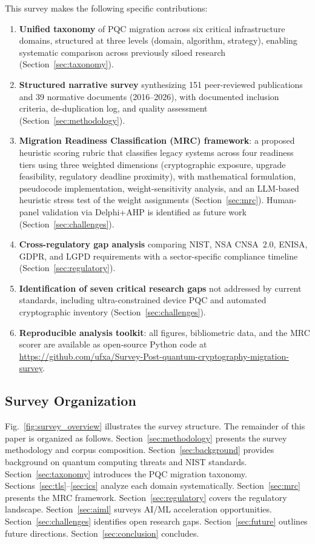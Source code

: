 \documentclass[journal]{IEEEtran}
\begin{document}
This survey makes the following specific contributions:
\begin{enumerate}
  \item \textbf{Unified taxonomy} of PQC migration across six critical
  infrastructure domains, structured at three levels (domain, algorithm,
  strategy), enabling systematic comparison across previously siloed research
  (Section~\ref{sec:taxonomy}).
  \item \textbf{Structured narrative survey} synthesizing 151 peer-reviewed
  publications and 39 normative documents (2016--2026), with documented
  inclusion criteria, de-duplication log, and quality assessment
  (Section~\ref{sec:methodology}).
  \item \textbf{Migration Readiness Classification (MRC) framework}: a proposed
  heuristic scoring rubric that classifies legacy systems across four readiness
  tiers using three weighted dimensions (cryptographic exposure, upgrade
  feasibility, regulatory deadline proximity), with mathematical formulation,
  pseudocode implementation, weight-sensitivity analysis, and an LLM-based
  heuristic stress test of the weight assignments
  (Section~\ref{sec:mrc}). Human-panel validation via Delphi+AHP is identified as
  future work (Section~\ref{sec:challenges}).
  \item \textbf{Cross-regulatory gap analysis} comparing NIST, NSA CNSA~2.0,
  ENISA, GDPR, and LGPD requirements with a sector-specific compliance
  timeline (Section~\ref{sec:regulatory}).
  \item \textbf{Identification of seven critical research gaps} not addressed by
  current standards, including ultra-constrained device PQC and automated
  cryptographic inventory (Section~\ref{sec:challenges}).
  \item \textbf{Reproducible analysis toolkit}: all figures, bibliometric data,
  and the MRC scorer are available as open-source Python code at
  \url{https://github.com/ufxa/Survey-Post-quantum-cryptography-migration-survey}.
\end{enumerate}

\subsection{Survey Organization}

Fig.~\ref{fig:survey_overview} illustrates the survey structure. The remainder
of this paper is organized as follows. Section~\ref{sec:methodology} presents
the survey methodology and corpus composition. Section~\ref{sec:background} provides background
on quantum computing threats and NIST standards. Section~\ref{sec:taxonomy}
introduces the PQC migration taxonomy. Sections~\ref{sec:tls}--\ref{sec:ics}
analyze each domain systematically. Section~\ref{sec:mrc} presents the MRC
framework. Section~\ref{sec:regulatory} covers the regulatory landscape.
Section~\ref{sec:aiml} surveys AI/ML acceleration opportunities.
Section~\ref{sec:challenges} identifies open research gaps. Section~\ref{sec:future}
outlines future directions. Section~\ref{sec:conclusion} concludes.
\end{document}
